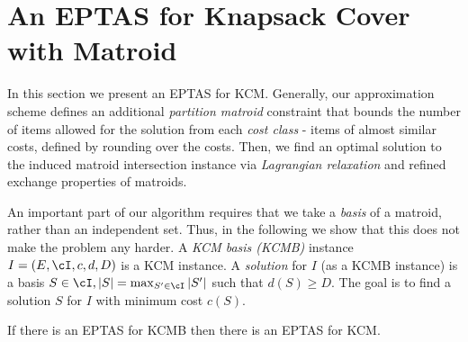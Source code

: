 



\section{An EPTAS for Knapsack Cover with Matroid}



In this section we present an EPTAS for KCM. Generally, our approximation scheme defines an additional {\em partition matroid} constraint that bounds the number of items allowed for the solution from each {\em cost class} - items of almost similar costs, defined by rounding over the costs. Then, we find an optimal solution to the induced matroid intersection instance via {\em Lagrangian relaxation} and refined exchange properties of matroids.
 
An important part of our algorithm requires that we take a {\em basis} of a matroid, rather than an independent set. Thus, in the following we show that this does not make the problem any harder. A {\em KCM basis (KCMB)} instance $I = (E,\cI,c,d,D)$ is a KCM instance. A {\em solution} for $I$ (as a KCMB instance) is a basis $S \in \cI, |S| = \max_{S' \in \cI} |S'|$ such that $d(S) \geq D$. The goal is to find a solution $S$ for $I$ with minimum cost $c(S)$. %

\begin{lemma}
	\label{lem:b}
If there is an \textnormal{EPTAS} for \textnormal{KCMB} then there is an \textnormal{EPTAS} for \textnormal{KCM}.
\end{lemma}

